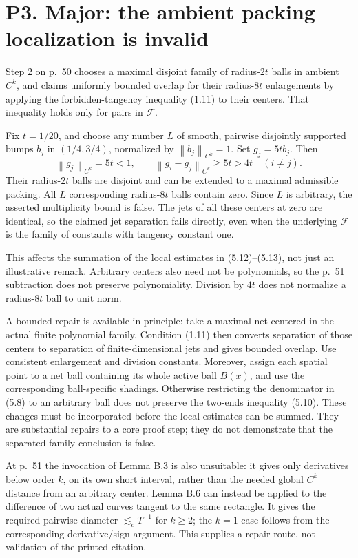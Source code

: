 \documentclass[10pt]{article}
\begin{document}
\section*{P3. Major: the ambient packing localization is invalid}
Step 2 on p. 50 chooses a maximal disjoint family of radius-\(2t\) balls in ambient \(C^k\), and claims uniformly bounded overlap for their radius-\(8t\) enlargements by applying the forbidden-tangency inequality (1.11) to their centers. That inequality holds only for pairs in \(\mathcal F\).\par
Fix \(t=1/20\), and choose any number \(L\) of smooth, pairwise disjointly supported bumps \(b_j\) in \((1/4,3/4)\), normalized by \(\left\|b_j\right\|_{C^k}=1\). Set \(g_j=5t b_j\). Then \[\left\|g_j\right\|_{C^k}=5t<1,\qquad
 \left\|g_i-g_j\right\|_{C^k}\ge5t>4t\quad(i\ne j).\] Their radius-\(2t\) balls are disjoint and can be extended to a maximal admissible packing. All \(L\) corresponding radius-\(8t\) balls contain zero. Since \(L\) is arbitrary, the asserted multiplicity bound is false. The jets of all these centers at zero are identical, so the claimed jet separation fails directly, even when the underlying \(\mathcal F\) is the family of constants with tangency constant one.\par
This affects the summation of the local estimates in (5.12)–(5.13), not just an illustrative remark. Arbitrary centers also need not be polynomials, so the p. 51 subtraction does not preserve polynomiality. Division by \(4t\) does not normalize a radius-\(8t\) ball to unit norm.\par
A bounded repair is available in principle: take a maximal net centered in the actual finite polynomial family. Condition (1.11) then converts separation of those centers to separation of finite-dimensional jets and gives bounded overlap. Use consistent enlargement and division constants. Moreover, assign each spatial point to a net ball containing its whole active ball \(B(x)\), and use the corresponding ball-specific shadings. Otherwise restricting the denominator in (5.8) to an arbitrary ball does not preserve the two-ends inequality (5.10). These changes must be incorporated before the local estimates can be summed. They are substantial repairs to a core proof step; they do not demonstrate that the separated-family conclusion is false.\par
At p. 51 the invocation of Lemma B.3 is also unsuitable: it gives only derivatives below order \(k\), on its own short interval, rather than the needed global \(C^k\) distance from an arbitrary center. Lemma B.6 can instead be applied to the difference of two actual curves tangent to the same rectangle. It gives the required pairwise diameter \(\lesssim_c T^{-1}\) for \(k\ge2\); the \(k=1\) case follows from the corresponding derivative/sign argument. This supplies a repair route, not validation of the printed citation.\par
\end{document}
